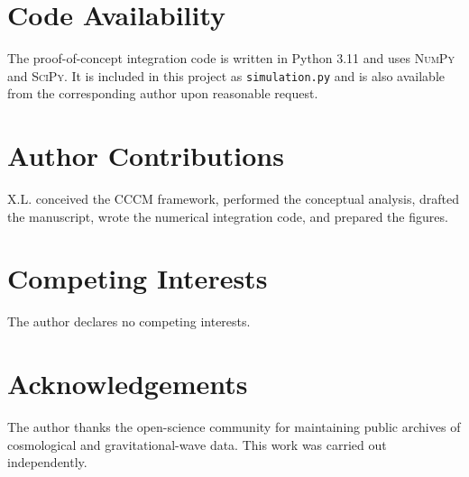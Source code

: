\documentclass[a4paper,11pt]{article}
\newcommand{\CCCM}{CCCM}
\begin{document}
\section*{Code Availability}

The proof-of-concept integration code is written in Python 3.11 and uses \textsc{NumPy} and \textsc{SciPy}. It is included in this project as \texttt{simulation.py} and is also available from the corresponding author upon reasonable request.

\section*{Author Contributions}

X.L. conceived the \CCCM{} framework, performed the conceptual analysis, drafted the manuscript, wrote the numerical integration code, and prepared the figures.

\section*{Competing Interests}

The author declares no competing interests.

\section*{Acknowledgements}

The author thanks the open-science community for maintaining public archives of cosmological and gravitational-wave data. This work was carried out independently.
\end{document}
